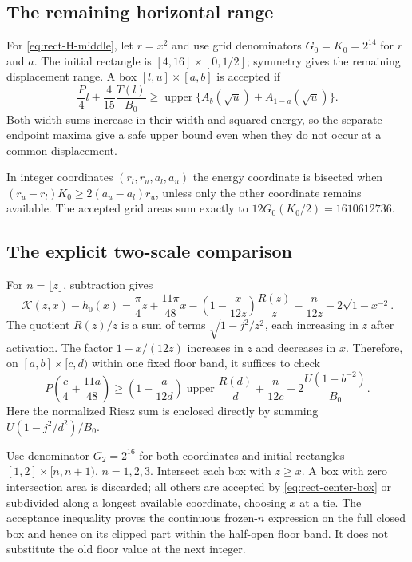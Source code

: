 \documentclass[11pt,reqno]{amsart}
\numberwithin{equation}{section}
\begin{document}
\subsection*{The remaining horizontal range}

For \eqref{eq:rect-H-middle}, let $r=x^2$ and use grid
denominators $G_0=K_0=2^{14}$ for $r$ and $a$. The initial
rectangle is $[4,16]\times[0,1/2]$; symmetry gives the
remaining displacement range. A box $[l,u]\times[a,b]$ is
accepted if
\begin{equation}\label{eq:rect-H-box}
 \frac P4l+\frac4{15}\frac{T(l)}{B_0}
 \ge\operatorname{upper}
       \{A_b(\sqrt u)+A_{1-a}(\sqrt u)\}.
\end{equation}
Both width sums increase in their width and squared energy,
so the separate endpoint maxima give a safe upper bound even
when they do not occur at a common displacement.

In integer coordinates $(r_l,r_u,a_l,a_u)$ the energy
coordinate is bisected when
$(r_u-r_l)K_0\ge2(a_u-a_l)r_u$, unless only the other
coordinate remains available. The accepted grid areas sum
exactly to $12G_0(K_0/2)=1610612736$.

\subsection*{The explicit two-scale comparison}

For $n=\lfloor z\rfloor$, subtraction gives
\begin{equation}\label{eq:rect-center-expanded}
 \mathcal K(z,x)-h_0(x)
 =\frac\pi4z+\frac{11\pi}{48}x
 -\left(1-\frac{x}{12z}\right)\frac{R(z)}z
 -\frac n{12z}-2\sqrt{1-x^{-2}}.
\end{equation}
The quotient $R(z)/z$ is a sum of terms
$\sqrt{1-j^2/z^2}$, each increasing in $z$ after activation.
The factor $1-x/(12z)$ increases in $z$ and decreases in $x$.
Therefore, on $[a,b]\times[c,d)$ within one fixed floor
band, it suffices to check
\begin{equation}\label{eq:rect-center-box}
 P\left(\frac c4+\frac{11a}{48}\right)
 \ge\left(1-\frac a{12d}\right)
       \operatorname{upper}\frac{R(d)}d
       +\frac n{12c}
       +2\frac{U(1-b^{-2})}{B_0}.
\end{equation}
Here the normalized Riesz sum is enclosed directly by summing
$U(1-j^2/d^2)/B_0$.

Use denominator $G_2=2^{16}$ for both coordinates and initial
rectangles $[1,2]\times[n,n+1)$, $n=1,2,3$. Intersect
each box with $z\ge x$. A box with zero intersection area is
discarded; all others are accepted by
\eqref{eq:rect-center-box} or subdivided along a longest
available coordinate, choosing $x$ at a tie.
The acceptance inequality proves the continuous frozen-$n$
expression on the full closed box and hence on its clipped
part within the half-open floor band. It does not substitute
the old floor value at the next integer.
\end{document}
